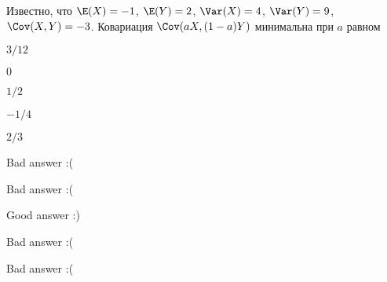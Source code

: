 
\begin{question}
Известно, что \(\E(X)=-1\), \(\E(Y)=2\), \(\Var(X)=4\), \(\Var(Y)=9\),
\(\Cov(X,Y)=-3\). Ковариация \(\Cov(aX, (1-a)Y)\) минимальна при \(a\)
равном
\begin{answerlist}
  \item \(3/12\)
  \item \(0\)
  \item \(1/2\)
  \item \(-1/4\)
  \item \(2/3\)
\end{answerlist}
\end{question}

\begin{solution}
\begin{answerlist}
  \item Bad answer :(
  \item Bad answer :(
  \item Good answer :)
  \item Bad answer :(
  \item Bad answer :(
\end{answerlist}
\end{solution}

